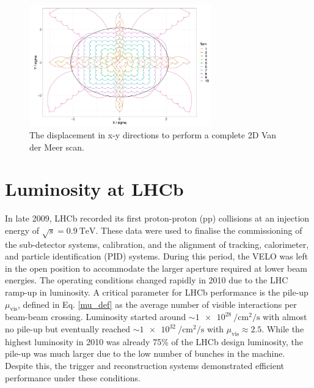 \begin{figure}
    \centering
    \includegraphics[width=0.7\textwidth]{figures/vdm_steps_xy.png}
    \caption{The displacement in x-y directions to perform a complete 2D Van der Meer scan.}
    \label{fig:vdm_steps_xy}
\end{figure}



\section{Luminosity at LHCb}
In late 2009, LHCb recorded its first proton-proton (pp) collisions at an injection energy of $\sqrt{s}=\SI{0.9}{\tera\eV}$. These data were used to finalise the commissioning of the sub-detector systems, calibration, and the alignment of tracking, calorimeter, and particle identification (PID) systems. During this period, the VELO was left in the open position to accommodate the larger aperture required at lower beam energies.
The operating conditions changed rapidly in 2010 due to the LHC ramp-up in luminosity. A critical parameter for LHCb performance is the pile-up \(\mu_{\text{vis}}\), defined in Eq. \ref{mu_def} as the average number of visible interactions per beam-beam crossing. Luminosity started around $\sim \SI{1e28}{\per\centi\meter\squared\per\second}$ with almost no pile-up but eventually reached $\sim \SI{1e32}{\per\centi\meter\squared\per\second}$ with $\mu_{\text{vis}} \approx 2.5$.
While the highest luminosity in 2010 was already 75\% of the LHCb design luminosity, the pile-up was much larger due to the low number of bunches in the machine. Despite this, the trigger and reconstruction systems demonstrated efficient performance under these conditions\cite{det_perf}.


